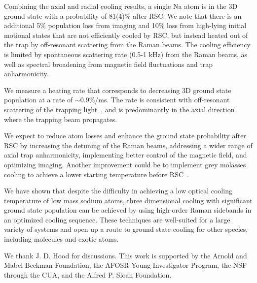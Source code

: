 \documentclass[aps,prl,twocolumn,groupedaddress]{revtex4-1}
\begin{document}
Combining the axial and radial cooling results,
 a single Na atom is in the 3D ground state with a probability of 81(4)\% after RSC.
 We note that there is an additional 5\% population loss from imaging and 10\% loss
from high-lying initial motional states that are not efficiently cooled by RSC,
but instead heated out of the trap by off-resonant scattering from the Raman beams.
The cooling efficiency is limited by spontaneous scattering rate (0.5-1 kHz) from the Raman beams,
as well as spectral broadening from magnetic field fluctuations and trap anharmonicity.

We measure a heating rate that corresponds to decreasing 3D ground state population
at a rate of $\sim0.9$\%/ms.
The rate is consistent with off-resonant scattering of the trapping light~\cite{Grimm2000},
and is predominantly in the axial direction where the trapping beam propagates.

We expect to reduce atom losses and enhance the ground state probability after RSC
by increasing the detuning of the Raman beams,
addressing a wider range of axial trap anharmonicity,
implementing better control of the magnetic field, and optimizing imaging.
Another improvement could be to implement grey molasses cooling to achieve
a lower starting temperature before RSC~\cite{Colzi2016}.

We have shown that despite the difficulty in achieving a low optical cooling temperature
of low mass sodium atoms,  three dimensional cooling
with significant ground state population can be achieved by using high-order Raman sidebands
in an optimized cooling sequence.
These techniques are well-suited for a large variety of systems
and open up a route to ground state cooling for other species,
including molecules and exotic atoms.

We thank J. D. Hood for discussions.
This work is supported by the Arnold and Mabel Beckman Foundation, the AFOSR Young Investigator Program, the NSF through the CUA,
and the Alfred P. Sloan Foundation.


\end{document}
